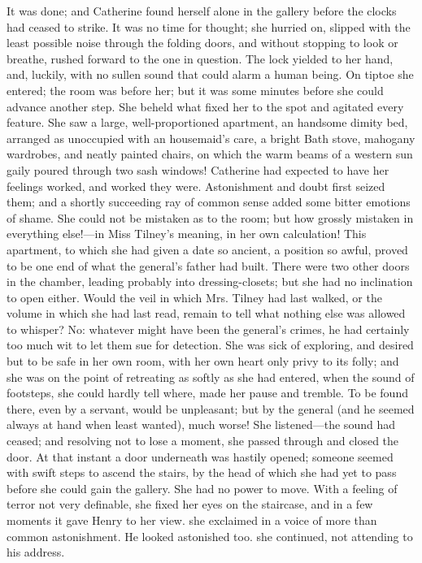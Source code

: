 It was done; and Catherine found herself alone in the gallery before the clocks had ceased to strike. It was no time for thought; she hurried on, slipped with the least possible noise through the folding doors, and without stopping to look or breathe, rushed forward to the one in question. The lock yielded to her hand, and, luckily, with no sullen sound that could alarm a human being. On tiptoe she entered; the room was before her; but it was some minutes before she could advance another step. She beheld what fixed her to the spot and agitated every feature. She saw a large, well-proportioned apartment, an handsome dimity bed, arranged as unoccupied with an housemaid's care, a bright Bath stove, mahogany wardrobes, and neatly painted chairs, on which the warm beams of a western sun gaily poured through two sash windows! Catherine had expected to have her feelings worked, and worked they were. Astonishment and doubt first seized them; and a shortly succeeding ray of common sense added some bitter emotions of shame. She could not be mistaken as to the room; but how grossly mistaken in everything else!---in Miss Tilney's meaning, in her own calculation! This apartment, to which she had given a date so ancient, a position so awful, proved to be one end of what the general's father had built. There were two other doors in the chamber, leading probably into dressing-closets; but she had no inclination to open either. Would the veil in which Mrs. Tilney had last walked, or the volume in which she had last read, remain to tell what nothing else was allowed to whisper? No: whatever might have been the general's crimes, he had certainly too much wit to let them sue for detection. She was sick of exploring, and desired but to be safe in her own room, with her own heart only privy to its folly; and she was on the point of retreating as softly as she had entered, when the sound of footsteps, she could hardly tell where, made her pause and tremble. To be found there, even by a servant, would be unpleasant; but by the general (and he seemed always at hand when least wanted), much worse! She listened---the sound had ceased; and resolving not to lose a moment, she passed through and closed the door. At that instant a door underneath was hastily opened; someone seemed with swift steps to ascend the stairs, by the head of which she had yet to pass before she could gain the gallery. She had no power to move. With a feeling of terror not very definable, she fixed her eyes on the staircase, and in a few moments it gave Henry to her view.  she exclaimed in a voice of more than common astonishment. He looked astonished too.  she continued, not attending to his address. 

